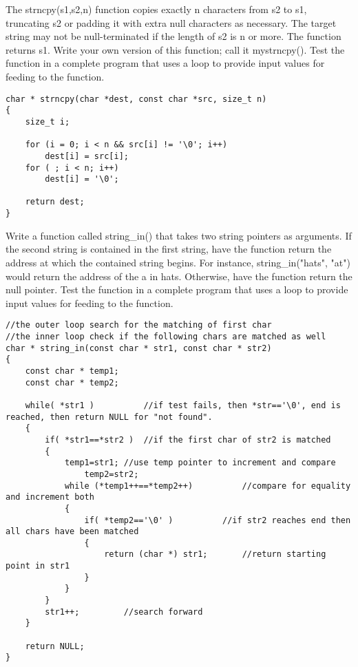 \begin{question}
  The strncpy(s1,s2,n) function copies exactly n characters from s2 to s1, truncating
  s2 or padding it with extra null characters as necessary. The target string may not be
  null-terminated if the length of s2 is n or more. The function returns s1. Write your own
  version of this function; call it mystrncpy(). Test the function in a complete program
  that uses a loop to provide input values for feeding to the function.
\end{question}
\begin{solution}
  \begin{verbatim}
char * strncpy(char *dest, const char *src, size_t n)
{
    size_t i;

    for (i = 0; i < n && src[i] != '\0'; i++)
        dest[i] = src[i];
    for ( ; i < n; i++)
        dest[i] = '\0';

    return dest;
}
  \end{verbatim}
\end{solution}

\begin{question}
Write a function called string_in() that takes two string pointers as arguments. If
the second string is contained in the first string, have the function return the address
at which the contained string begins. For instance, string_in("hats", "at") would
return the address of the a in hats. Otherwise, have the function return the null pointer.
Test the function in a complete program that uses a loop to provide input values for
feeding to the function.
\end{question}
\begin{solution}
  \begin{verbatim}
//the outer loop search for the matching of first char
//the inner loop check if the following chars are matched as well
char * string_in(const char * str1, const char * str2)
{
	const char * temp1;
	const char * temp2;

	while( *str1 )			//if test fails, then *str=='\0', end is reached, then return NULL for "not found".
	{
		if( *str1==*str2 )	//if the first char of str2 is matched
		{
			temp1=str1;	//use temp pointer to increment and compare
		       	temp2=str2;
			while (*temp1++==*temp2++)			//compare for equality and increment both
			{
				if( *temp2=='\0' )			//if str2 reaches end then all chars have been matched
				{
					return (char *) str1;		//return starting point in str1
				}
			}
		}
		str1++;			//search forward
	}

	return NULL;
}
  \end{verbatim}
\end{solution}

